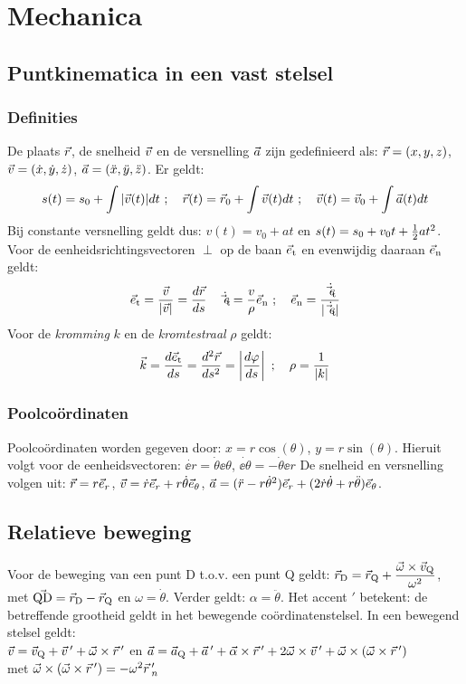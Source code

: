 \chapter{Mechanica}
\section{Puntkinematica in een vast stelsel}
\subsection{Definities}
De plaats $\vec{r}$, de snelheid $\vec{v}$ en de versnelling $\vec{a}$ zijn gedefinieerd
als:
$\vec{r}=(x,y,z)$, $\vec{v}=(\dot{x},\dot{y},\dot{z})$, $\vec{a}=(\ddot{x},\ddot{y},\ddot{z})$.
Er geldt:
\[
s(t)=s_0+\int|\vec{v}(t)|dt~;~~~\vec{r}(t)=\vec{r}_0+\int\vec{v}(t)dt~;~~~\vec{v}(t)=\vec{v}_0+\int\vec{a}(t)dt
\]
Bij constante versnelling geldt dus: $v(t)=v_0+at$ en $s(t)=s_0+v_0t+\mbox{$\frac{1}{2}$} at^2$.
\npar
Voor de eenheidsrichtingsvectoren $\perp$ op de baan $\vec{e}_{\rm t}$ en evenwijdig
daaraan $\vec{e}_{\rm n}$ geldt:
\[
\vec{e}_{\rm t}=\frac{\vec{v}}{|\vec{v}|}=\frac{d\vec{r}}{ds}~~~\dot{\vec{e}_{\rm t}}=
\frac{v}{\rho}\vec{e}_{\rm n}~;~~~\vec{e}_{\rm n}=\frac{\dot{\vec{e}_{\rm t}}}{|\dot{\vec{e}_{\rm t}}|}
\]
Voor de {\it kromming} $k$ en de {\it kromtestraal} $\rho$ geldt:
\[
\vec{k}=\frac{d\vec{e}_{\rm t}}{ds}=\frac{d^2\vec{r}}{ds^2}=\left|\frac{d\varphi}{ds}\right|
~;~~~\rho=\frac{1}{|k|}
\]
\subsection{Poolco\"ordinaten}
Poolco\"ordinaten worden gegeven door: $x=r\cos(\theta)$, $y=r\sin(\theta)$.
Hieruit volgt voor de eenheidsvectoren: $\dot{\ee{r}}=\dot{\theta}\ee{\theta}$,
$\dot{\ee{\theta}}=-\dot{\theta}\ee{r}$
\npar
De snelheid en versnelling volgen uit: $\vec{r}=r\vec{e}_{r}$,
$\vec{v}=\dot{r}\vec{e}_{r}+r\dot{\theta}\vec{e}_{\theta}$,
$\vec{a}=(\ddot{r}-r\dot{\theta}^2)\vec{e}_{r}+(2\dot{r}\dot{\theta}+r\ddot{\theta})\vec{e}_{\theta}$.

\section{Relatieve beweging}
Voor de beweging van een punt D t.o.v. een punt Q geldt:
$\displaystyle\vec{r}_{\rm D}=\vec{r}_{\rm Q}+\frac{\vec{\omega}\times\vec{v}_{\rm Q}}{\omega^2}$,
met $\vec{\rm QD}=\vec{r}_{\rm D}-\vec{r}_{\rm Q}$ en $\omega=\dot{\theta}$.
\npar
Verder geldt:
$\alpha=\ddot{\theta}$. Het accent $'$ betekent: de betreffende grootheid geldt
in het bewegende co\"ordinatenstelsel. In een bewegend stelsel geldt:\\
$\vec{v}=\vec{v}_{\rm Q}+\vec{v}\,'+\vec{\omega}\times\vec{r}\,'$ en
$\vec{a}=\vec{a}_{\rm Q}+\vec{a}\,'+\vec{\alpha}\times\vec{r}\,'+2\vec{\omega}\times\vec{v}\,'+\vec{\omega}\times(\vec{\omega}\times\vec{r}\,')$\\
met $\vec{\omega}\times(\vec{\omega}\times\vec{r}\,')=-\omega^2\vec{r}\,'_n$

